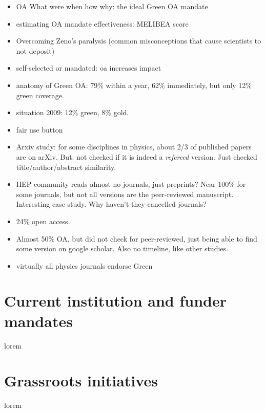 \documentclass[11pt, openany, oneside, article, a4paper, twocolumn]{memoir}
\begin{document}
\begin{itemize}
  \item OA What were when how why: the ideal Green OA mandate \cite{harnad2015openwhat}
  \item estimating OA mandate effectiveness: MELIBEA score \cite{vincent2016estimating}
  \item Overcoming Zeno's paralysis (common misconceptions that cause scientists to not deposit) \cite{harnad2006opening}
  \item self-selected or mandated: oa increases impact \cite{gargouri2010self}
  \item anatomy of Green OA: 79\% within a year, 62\% immediately, but only 12\% green coverage. \cite{bjork2014anatomy}
  \item situation 2009: 12\% green, 8\% gold. \cite{bjork2010open}
  \item fair use button \cite{sale2010open}
  \item Arxiv study: for some disciplines in physics, about 2/3 of published papers are on arXiv. But: not checked if it is indeed a
  \emph{refereed} version. Just checked title/author/abstract similarity.
  \cite{lariviere2014arxiv}
  \item \cite{gentil2010citinghep} HEP community reads almost no journals, just preprints? Near 100\% for some journals, but 
  not all versions are the peer-reviewed manuscript. Interesting case study. Why haven't they cancelled journals?
  \item \cite{khabsa2014number} 24\% open access.
  \item \cite{archambault2013tipping} Almost 50\% OA, but did not check for peer-reviewed, just being able to find some version on google scholar.
  Also no timeline, like other studies.
  \item \cite{sherpa_romeo} virtually all physics journals endorse Green

\end{itemize}

\section{Current institution and funder mandates}

lorem

\section{Grassroots initiatives}

lorem

\printbibliography

\end{document}
